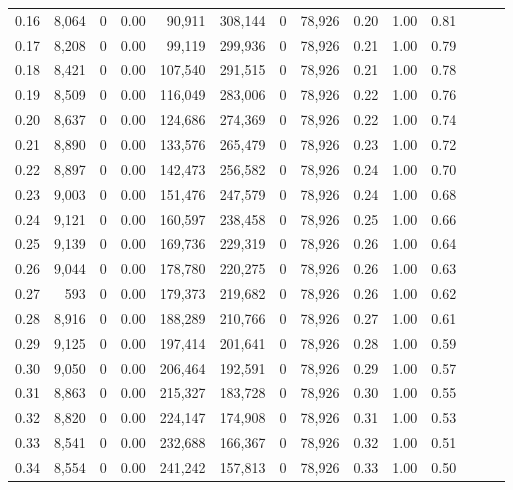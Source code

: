 \begin{tabular}{rrrrrrrrrrrrrr}
0.16 &  8,064 &      0 &  0.00 &   90,911 &  308,144 &       0 &  78,926 &  0.20 &  1.00 &      0.81 \\
0.17 &  8,208 &      0 &  0.00 &   99,119 &  299,936 &       0 &  78,926 &  0.21 &  1.00 &      0.79 \\
0.18 &  8,421 &      0 &  0.00 &  107,540 &  291,515 &       0 &  78,926 &  0.21 &  1.00 &      0.78 \\
0.19 &  8,509 &      0 &  0.00 &  116,049 &  283,006 &       0 &  78,926 &  0.22 &  1.00 &      0.76 \\
0.20 &  8,637 &      0 &  0.00 &  124,686 &  274,369 &       0 &  78,926 &  0.22 &  1.00 &      0.74 \\
0.21 &  8,890 &      0 &  0.00 &  133,576 &  265,479 &       0 &  78,926 &  0.23 &  1.00 &      0.72 \\
0.22 &  8,897 &      0 &  0.00 &  142,473 &  256,582 &       0 &  78,926 &  0.24 &  1.00 &      0.70 \\
0.23 &  9,003 &      0 &  0.00 &  151,476 &  247,579 &       0 &  78,926 &  0.24 &  1.00 &      0.68 \\
0.24 &  9,121 &      0 &  0.00 &  160,597 &  238,458 &       0 &  78,926 &  0.25 &  1.00 &      0.66 \\
0.25 &  9,139 &      0 &  0.00 &  169,736 &  229,319 &       0 &  78,926 &  0.26 &  1.00 &      0.64 \\
0.26 &  9,044 &      0 &  0.00 &  178,780 &  220,275 &       0 &  78,926 &  0.26 &  1.00 &      0.63 \\
0.27 &    593 &      0 &  0.00 &  179,373 &  219,682 &       0 &  78,926 &  0.26 &  1.00 &      0.62 \\
0.28 &  8,916 &      0 &  0.00 &  188,289 &  210,766 &       0 &  78,926 &  0.27 &  1.00 &      0.61 \\
0.29 &  9,125 &      0 &  0.00 &  197,414 &  201,641 &       0 &  78,926 &  0.28 &  1.00 &      0.59 \\
0.30 &  9,050 &      0 &  0.00 &  206,464 &  192,591 &       0 &  78,926 &  0.29 &  1.00 &      0.57 \\
0.31 &  8,863 &      0 &  0.00 &  215,327 &  183,728 &       0 &  78,926 &  0.30 &  1.00 &      0.55 \\
0.32 &  8,820 &      0 &  0.00 &  224,147 &  174,908 &       0 &  78,926 &  0.31 &  1.00 &      0.53 \\
0.33 &  8,541 &      0 &  0.00 &  232,688 &  166,367 &       0 &  78,926 &  0.32 &  1.00 &      0.51 \\
0.34 &  8,554 &      0 &  0.00 &  241,242 &  157,813 &       0 &  78,926 &  0.33 &  1.00 &      0.50 \\

\end{tabular}

